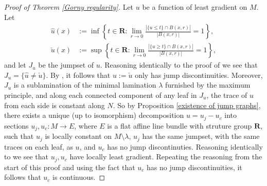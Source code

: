 \documentclass[reqno,10pt]{amsart}
\newcommand{\RR}{\mathbf{R}}
\theoremstyle{definition}
\numberwithin{equation}{section}
\begin{document}
\begin{proof}[Proof of Theorem \ref{Gorny regularity}]
Let $u$ be a function of least gradient on $M$.
Let
\begin{align*}
\hat u(x) &:= \inf\left\{t \in \RR: \lim_{r \to 0} \frac{|\{u \leq t\} \cap B(x, r)|}{|B(x, r)|} = 1\right\},\\
\check u(x) &:= \sup\left\{t \in \RR: \lim_{r \to 0} \frac{|\{u \geq t\} \cap B(x, r)|}{|B(x, r)|} = 1\right\},
\end{align*}
and let $J_u$ be the jumpset of $u$.
Reasoning identically to the proof of \cite[Proposition 3.9]{górny2017planar} we see that $J_u = \{\hat u \neq \check u\}$.
By \cite[Theorem 4.1]{HakkarainenKorteLahtiShanmugalingam+2015}, it follows that $u := \check u$ only has jump discontinuities.
Moreover, $J_u$ is a sublamination of the minimal lamination $\lambda$ furnished by the maximum principle, and along each connected component of any leaf in $J_u$, the trace of $u$ from each side is constant along $N$.
So by Proposition \ref{existence of jump graphs}, there exists a unique (up to isomorphism) decomposition $u = u_j - u_c$ into sections $u_j, u_c: M \to E$, where $E$ is a flat affine line bundle with struture group $\RR$, such that $u_j$ is locally constant on $M \setminus \lambda$, $u_j$ has the same jumpset, with the same traces on each leaf, as $u$, and $u_c$ has no jump discontinuties.
Reasoning identically to \cite[pg11]{górny2017planar} we see that $u_j, u_c$ have locally least gradient.
Repeating the reasoning from the start of this proof and using the fact that $u_c$ has no jump discontinuities, it follows that $u_c$ is continuous.
\end{proof}

\end{document}
